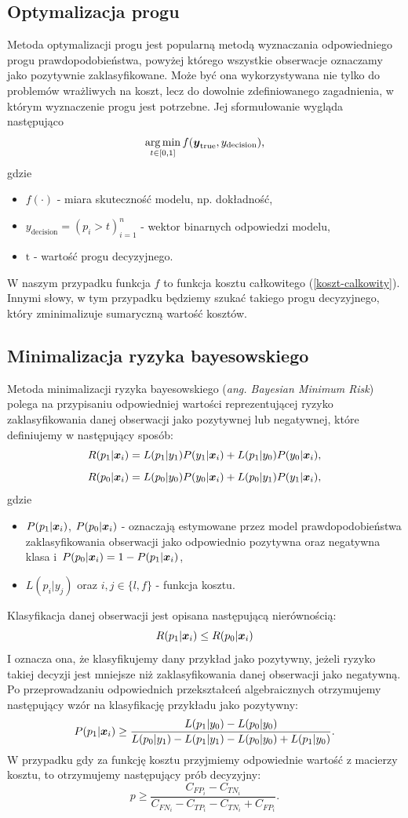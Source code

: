 \documentclass[inzynierska]{pwr_wmat_praca_dyplomowa}
\theoremstyle{plain}
\numberwithin{theorem}{chapter}
\theoremstyle{definition}
\numberwithin{theorem}{chapter}
\DeclareMathOperator*{\argmin}{arg\,min}
\begin{document}
\subsection{Optymalizacja progu}
Metoda optymalizacji progu jest popularną metodą wyznaczania odpowiedniego progu prawdopodobieństwa, powyżej którego wszystkie obserwacje oznaczamy jako pozytywnie zaklasyfikowane. Może być ona wykorzystywana nie tylko do problemów wrażliwych na koszt, lecz do dowolnie zdefiniowanego zagadnienia, w którym wyznaczenie progu jest potrzebne. Jej sformułowanie wygląda następująco
$$ \argmin_{t \in [0,1]} f(\ytrue, y_{\text{decision}}) \text{,} $$
gdzie 
\begin{itemize}
	\item $ f(\cdot) $ - miara skuteczność modelu, np. dokładność,
	\item $ y_{\text{decision}} = (p_i > t)_{i=1}^n $ - wektor binarnych odpowiedzi modelu,
	\item $ \text{t} $ - wartość progu decyzyjnego.
\end{itemize}{}
W naszym przypadku funkcja $f$ to funkcja kosztu całkowitego (\ref{koszt-calkowity}). Innymi słowy, w tym przypadku będziemy szukać takiego progu decyzyjnego, który zminimalizuje sumaryczną wartość kosztów.

\subsection{Minimalizacja ryzyka bayesowskiego}
Metoda minimalizacji ryzyka bayesowskiego (\textit{ang. Bayesian Minimum Risk}) polega na przypisaniu odpowiedniej wartości reprezentującej ryzyko zaklasyfikowania danej obserwacji jako pozytywnej lub negatywnej, które definiujemy w następujący sposób:
$$ R(p_1|\boldsymbol{x}_{i}) = L(p_1|y_1)P(y_1|\boldsymbol{x}_{i}) + L(p_1|y_0)P(y_0|\boldsymbol{x}_{i}) \text{,}$$
$$ R(p_0|\boldsymbol{x}_{i}) = L(p_0|y_0)P(y_0|\boldsymbol{x}_{i}) + L(p_0|y_1)P(y_1|\boldsymbol{x}_{i}) \text{,}$$
gdzie
\begin{itemize}
	\item $P(p_1|\boldsymbol{x}_{i})$, $P(p_0|\boldsymbol{x}_{i})$ - oznaczają estymowane przez model prawdopodobieństwa zaklasyfikowania obserwacji jako odpowiednio pozytywna oraz negatywna klasa i~$P(p_0|\boldsymbol{x}_{i}) = 1 - P(p_1|\boldsymbol{x}_{i})$,
	\item $L(p_{i}|y_{j})$ oraz $i,j \in \{l,f\}$ - funkcja kosztu.
\end{itemize}{}
Klasyfikacja danej obserwacji jest opisana następującą nierównością:
$$ R(p_1|\boldsymbol{x}_{i}) \leq R(p_0|\boldsymbol{x}_{i})$$
I oznacza ona, że klasyfikujemy dany przykład jako pozytywny, jeżeli ryzyko takiej decyzji jest mniejsze niż zaklasyfikowania danej obserwacji jako negatywną. 
Po przeprowadzaniu odpowiednich przekształceń algebraicznych otrzymujemy następujący wzór na klasyfikację przykładu jako pozytywny:
$$ P(p_1|\boldsymbol{x}_{i}) \ge \frac{L(p_1|y_0) - L(p_0|y_0)}{L(p_0|y_1) - L(p_1|y_1) - L(p_0|y_0) + L(p_1|y_0)} \text{.}$$
W przypadku gdy za funkcję kosztu przyjmiemy odpowiednie wartość z macierzy kosztu, to otrzymujemy następujący prób decyzyjny:
$$ p \ge \frac{C_{FP_i} - C_{TN_i}}{C_{FN_i} - C_{TP_i} - C_{TN_i} + C_{FP_i}} \text{.}$$
\end{document}
